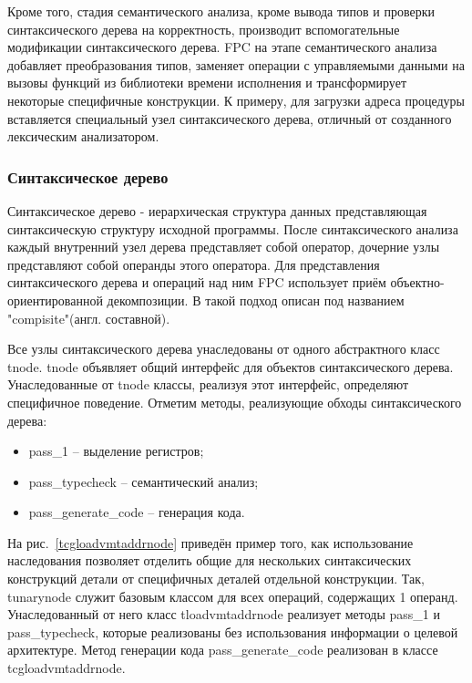 \documentclass{imcs}
\begin{document}
Кроме того, стадия семантического анализа, кроме вывода типов и проверки синтаксического
дерева на корректность, производит вспомогательные модификации синтаксического дерева.
FPC на этапе семантического анализа добавляет преобразования типов, заменяет операции
с управляемыми данными на вызовы функций из библиотеки времени исполнения и трансформирует
некоторые специфичные конструкции. К примеру, для загрузки адреса процедуры вставляется
специальный узел синтаксического дерева, отличный от созданного лексическим анализатором.

\subsubsection{Синтаксическое дерево}

Синтаксическое дерево - иерархическая структура данных представляющая синтаксическую
структуру исходной программы\cite{dragonbook}. После синтаксического анализа каждый внутренний узел 
дерева представляет собой оператор, дочерние узлы представляют собой операнды этого
оператора. Для представления синтаксического дерева и операций над ним FPC использует
приём объектно-ориентированной декомпозиции. В \cite{gof} такой подход описан под
названием "compisite"(англ. составной).

Все узлы синтаксического дерева унаследованы от одного абстрактного класс tnode.
tnode объявляет общий интерфейс для объектов синтаксического дерева. Унаследованные
от tnode классы, реализуя этот интерфейс, определяют специфичное поведение. Отметим
методы, реализующие обходы синтаксического дерева:
\begin{itemize}
    \item pass\_1 -- выделение регистров;
    \item pass\_typecheck -- семантический анализ;
    \item pass\_generate\_code -- генерация кода.
\end{itemize}

На рис.~\ref{tcgloadvmtaddrnode} приведён пример того, как использование
наследования позволяет отделить общие для 
нескольких синтаксических конструкций детали от специфичных деталей отдельной конструкции.
Так, tunarynode служит базовым классом для всех операций, содержащих 1 операнд.
Унаследованный от него класс tloadvmtaddrnode реализует методы pass\_1 и pass\_typecheck,
которые реализованы без использования информации о целевой архитектуре. Метод
генерации кода pass\_generate\_code реализован в классе \\ tcgloadvmtaddrnode.
\end{document}
